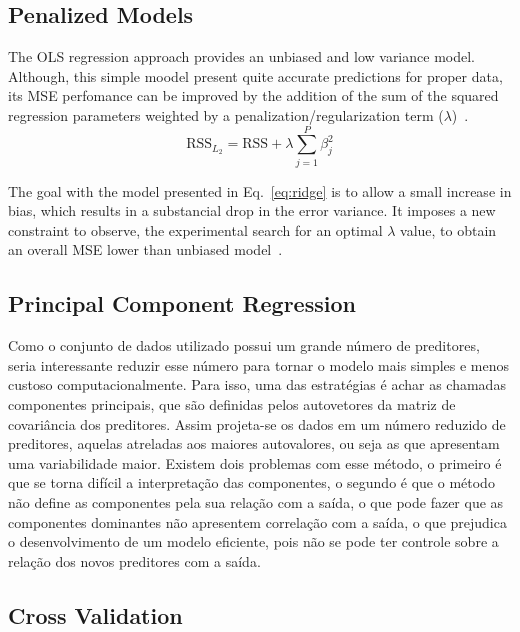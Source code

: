\clearpage

\subsection{Penalized Models}
The OLS regression approach provides an unbiased and low variance model. Although, this simple moodel present quite accurate predictions for proper data, its MSE perfomance can be improved by the addition of the sum of the squared regression parameters weighted by a penalization/regularization term ($\lambda$)~\cite{Kuhn2013}.
\begin{equation}
  \text{RSS}_{L_2} = \text{RSS} + \lambda \sum_{j = 1}^{P} \beta_{j}^2
  \label{eq:ridge}
\end{equation}

The goal with the model presented in Eq.~\ref{eq:ridge} is to allow a small increase in bias, which results in a substancial drop in the error variance. It imposes a new constraint to observe, the experimental search for an optimal $\lambda$ value, to obtain an overall MSE lower than unbiased model~\cite{James2013, Kuhn2013}.

\clearpage

\subsection{Principal Component Regression}
Como o conjunto de dados utilizado possui um grande
número de preditores, seria interessante reduzir esse número para tornar o modelo mais simples e menos custoso computacionalmente. Para isso, uma das estratégias é achar as chamadas componentes principais, que são definidas pelos autovetores da matriz de covariância dos preditores. Assim projeta-se os dados em um número reduzido de preditores, aquelas atreladas aos maiores autovalores, ou seja as que apresentam uma variabilidade maior. Existem dois problemas com esse método, o primeiro é que se torna difícil a interpretação das componentes, o segundo é que o método não define as componentes pela sua relação com a saída, o que pode fazer que as componentes dominantes não apresentem correlação com a saída, o que prejudica o desenvolvimento de um modelo eficiente, pois não se pode ter controle sobre a relação dos novos preditores com a saída.

\subsection{Cross Validation}

